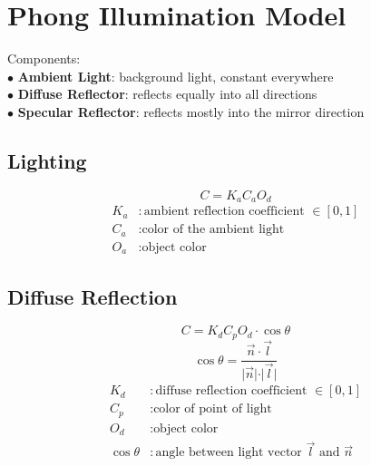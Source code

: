 \section{Phong Illumination Model}
Components: \\
$\bullet$ \textbf{Ambient Light}: background light, constant everywhere \\
$\bullet$ \textbf{Diffuse Reflector}: reflects equally into all directions \\
$\bullet$ \textbf{Specular Reflector}: reflects mostly into the mirror direction

\subsection{Lighting}

$$C = K_a C_a O_d$$
\begin{align*}
    K_a & : \text{ambient reflection coefficient }\in [0,1] \\
    C_a & : \text{color of the ambient light}               \\
    O_a & : \text{object color}
\end{align*}

\subsection{Diffuse Reflection}

\begin{center}
\end{center}

$$C = K_d C_p O_d \cdot \cos{\theta}$$
$$\cos{\theta} = \frac{\vec{n} \cdot \vec{l}}{\vert \vec{n} \vert \cdot \vert \vec{l} \vert}$$
\begin{align*}
    K_d          & : \text{diffuse reflection coefficient }\in [0, 1]                 \\
    C_p          & : \text{color of point of light}                                   \\
    O_d          & : \text{object color}                                              \\
    \cos{\theta} & : \text{angle between light vector } \vec{l}  \text{ and } \vec{n} \\
\end{align*}

